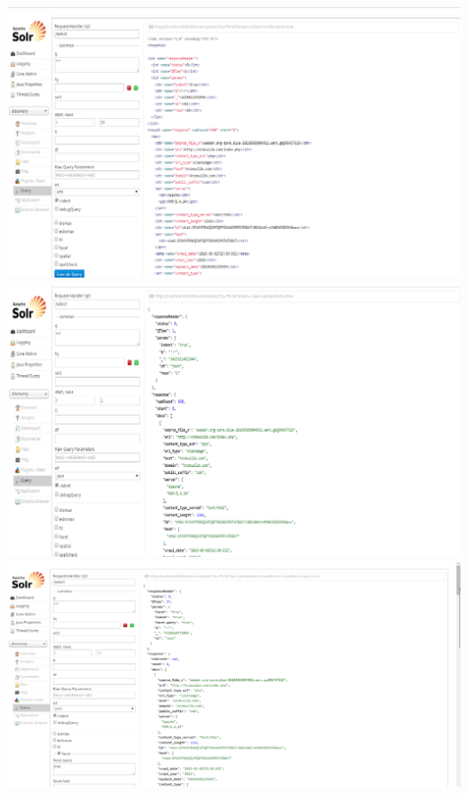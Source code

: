 \documentclass[paper=a4, fontsize=11pt]{scrartcl} %
\numberwithin{equation}{section} %
\numberwithin{figure}{section} %
\numberwithin{table}{section} %
\begin{document}
\begin{center}
\includegraphics[scale=.4]{query1.png}
\includegraphics[scale=.4]{query2.png}
\includegraphics[scale=.4]{query3.png}
\end{center}








\end{document}
